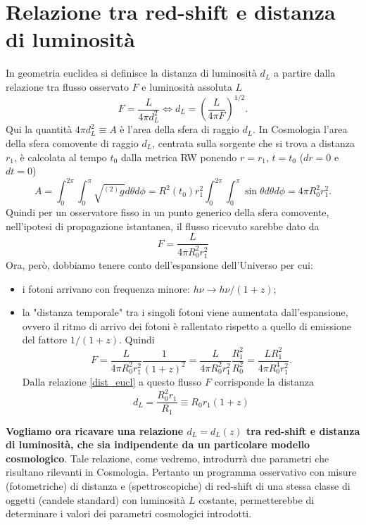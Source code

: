 \section{Relazione tra red-shift e distanza di luminosità}

In geometria euclidea si definisce la distanza di luminosità $d_L$ a partire
dalla relazione tra flusso osservato $F$ e luminosità assoluta $L$
\begin{equation}
  F = \frac{L}{4 \pi d^2_L} \iff d_L = \left(\frac{L}{4 \pi F} \right)^{1/2}.
  \label{dist_eucl}
\end{equation}
Qui la quantità $4 \pi d^2_L \equiv A$ è l'area della sfera di raggio $d_L$.  In
Cosmologia l'area della sfera comovente di raggio $d_L$, centrata sulla sorgente
che si trova a distanza $r_1$, è calcolata al tempo $t_0$ dalla metrica RW
ponendo $r=r_1$, $t=t_0$ ($dr=0$ e $dt=0$)
\begin{equation}
  A = \int_0^{2 \pi} \int_{0}^{\pi} \sqrt {^{(2)}g} d\theta d\phi = R^2(t_0)
  r^2_1 \int_0^{2 \pi} \int_{0}^{\pi} \sin \theta d\theta d\phi = 4 \pi R^2_0
  r^2_1.
\end{equation}
Quindi per un osservatore fisso in un punto generico della sfera comovente,
nell'ipotesi di propagazione istantanea, il flusso ricevuto sarebbe dato da
\begin{equation}
  F = \frac{L}{4 \pi R^2_0 r^2_1}
\end{equation}
Ora, però, dobbiamo tenere conto dell'espansione dell'Universo per cui:
\begin{itemize}
\item i fotoni arrivano con frequenza minore: $h \nu \to h \nu /(1+z)$;
\item la "distanza temporale" tra i singoli fotoni viene aumentata
  dall'espansione, ovvero il ritmo di arrivo dei fotoni è rallentato rispetto a
  quello di emissione del fattore $1/(1+z)$.  Quindi
  \begin{equation}
    F = \frac{L}{4 \pi R^2_0 r^2_1} \frac{1}{(1+z)^2} = \frac{L}{4 \pi R^2_0
      r^2_1} \frac{R^2_1}{R^2_0} = \frac{L R^2_1}{4 \pi R^4_0 r^2_1}.
  \end{equation}
  Dalla relazione \eqref{dist_eucl} a questo flusso $F$ corrisponde la distanza
  \begin{equation}
    d_L = \frac{R^2_0 r_1} {R_1} \equiv R_0 r_1 (1+z)
    \label{dis_lum}
  \end{equation}
\end{itemize}

{\bf Vogliamo ora ricavare una relazione $d_L=d_L(z)$ tra red-shift e distanza di
luminosità, che sia indipendente da un particolare modello cosmologico}. Tale
relazione, come vedremo, introdurrà due parametri che risultano rilevanti in
Cosmologia. Pertanto un programma osservativo con misure (fotometriche) di
distanza e (spettroscopiche) di red-shift di una stessa classe di oggetti
(candele standard) con luminosità $L$ costante, permetterebbe di determinare i
valori dei parametri cosmologici introdotti.

